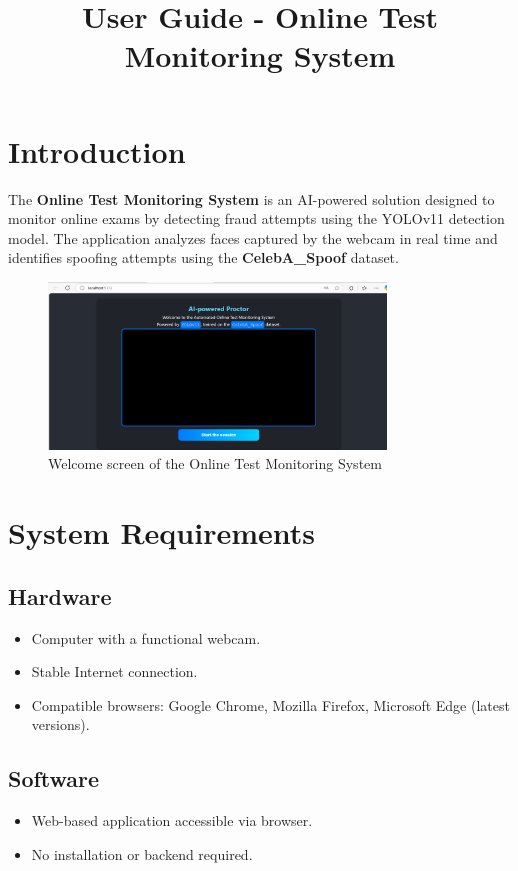 \documentclass[a4paper,12pt]{article}
\title{User Guide - Online Test Monitoring System}
\date{} %
\begin{document}
\maketitle

\tableofcontents
\newpage

\section{Introduction}
The \textbf{Online Test Monitoring System} is an AI-powered solution designed to monitor online exams by detecting fraud attempts using the YOLOv11 detection model. The application analyzes faces captured by the webcam in real time and identifies spoofing attempts using the \textbf{CelebA\_Spoof} dataset.

\begin{figure}[h!]
    \centering
    \includegraphics[width=0.8\textwidth]{IMG/accueil.png}
    \caption{Welcome screen of the Online Test Monitoring System}
    \label{fig:welcome_screen}
\end{figure}

\section{System Requirements}
\subsection{Hardware}
\begin{itemize}
    \item Computer with a functional webcam.
    \item Stable Internet connection.
    \item Compatible browsers: Google Chrome, Mozilla Firefox, Microsoft Edge (latest versions).
\end{itemize}

\subsection{Software}
\begin{itemize}
    \item Web-based application accessible via browser.
    \item No installation or backend required.
\end{itemize}
\end{document}
